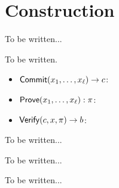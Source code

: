 \section{Construction}

To be written...

\begin{construction}
    To be written.
    \begin{itemize}
        \item $\mathsf{Commit}(x_1, \ldots, x_\ell) \to c$:
        \item $\mathsf{Prove}(x_1, \ldots, x_\ell): \pi$:
        \item $\mathsf{Verify}(c, x, \pi) \to b$:
    \end{itemize}
\end{construction}

\begin{theorem}[Correctness]
    To be written...
\end{theorem}

\begin{theorem}[Compactness]
    To be written...
\end{theorem}

\begin{theorem}[Soundness]
    To be written...
\end{theorem}
